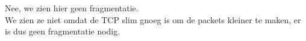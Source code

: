 Nee, we zien hier geen fragmentatie.\\

We zien ze niet omdat de TCP slim gnoeg is om de packets kleiner te maken, er is dus geen fragmentatie nodig. 